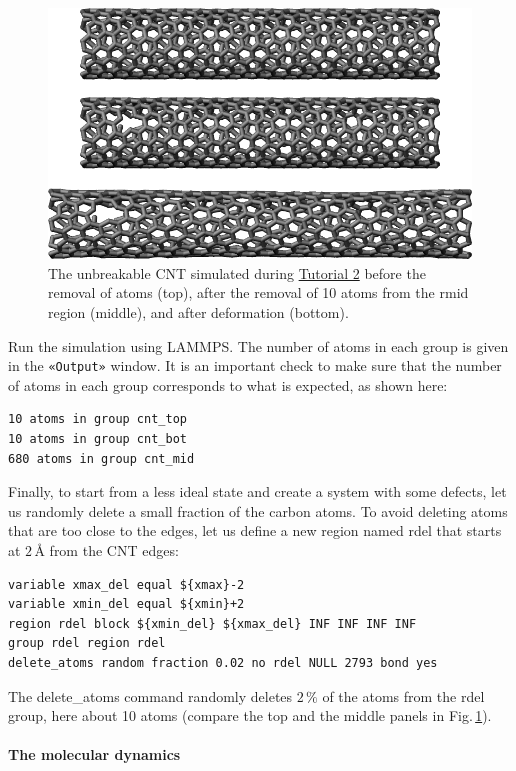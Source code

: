 \documentclass[9pt,tutorial]{livecoms}
\newcommand{\lmpcmd}[1]{\hspace{0pt}\colorbox{listing}{\textcolor{command}{\small{#1}}}\hspace{0pt}} %
\newcommand{\guicmd}[1]{\textcolor{command}{\texttt{«#1»}}} %
\begin{document}
\begin{figure}
\centering
\includegraphics[width=\linewidth]{CNT-unbreakable}
\caption{The unbreakable CNT simulated during \hyperref[carbon-nanotube-label]{Tutorial 2}
before the removal of atoms (top), after the removal of 10 atoms from the \lmpcmd{rmid}
region (middle), and after deformation (bottom).}
\label{fig:CNT-unbreakable}
\end{figure}

Run the simulation using LAMMPS.  The number of atoms in each group is given in
the \guicmd{Output} window.  It is an important check to make sure that the number
of atoms in each group corresponds to what is expected, as shown here:
\begin{lstlisting}
10 atoms in group cnt_top
10 atoms in group cnt_bot
680 atoms in group cnt_mid
\end{lstlisting}

Finally, to start from a less ideal state and create a system with some defects,
let us randomly delete a small fraction of the carbon atoms.  To avoid deleting
atoms that are too close to the edges, let us define a new region named \lmpcmd{rdel}
that starts at $2\,\text{\AA{}}$ from the CNT edges:
\begin{lstlisting}
variable xmax_del equal ${xmax}-2
variable xmin_del equal ${xmin}+2
region rdel block ${xmin_del} ${xmax_del} INF INF INF INF
group rdel region rdel
delete_atoms random fraction 0.02 no rdel NULL 2793 bond yes
\end{lstlisting}
The \lmpcmd{delete\_atoms} command randomly deletes $2\,\%$ of the atoms from
the \lmpcmd{rdel} group, here about 10 atoms (compare the top
and the middle panels in Fig.\,\ref{fig:CNT-unbreakable}).

\paragraph{The molecular dynamics}
\end{document}
